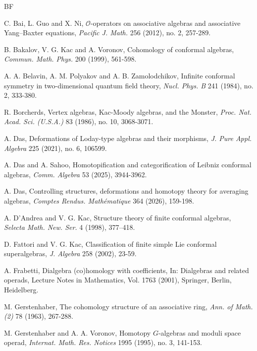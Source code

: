 \documentclass[a4paper,reqno,10pt]{amsart}
\theoremstyle{plain}
\theoremstyle{definition}
\theoremstyle{remark}
\begin{document}
\begin{thebibliography}{BF}

 C. Bai, L. Guo and X. Ni, $\mathcal{O}$-operators on associative algebras and associative Yang–Baxter equations, {\em Pacific J. Math. } 256 (2012), no. 2, 257-289.

B. Bakalov, V. G. Kac and A. Voronov, Cohomology of conformal algebras, {\em Commun. Math. Phys.} 200 (1999), 561-598.

 A. A. Belavin, A. M. Polyakov and A. B. Zamolodchikov, Infinite conformal symmetry in two-dimensional quantum field theory, {\em Nucl. Phys. B} 241 (1984), no. 2, 333-380.

 R. Borcherds, Vertex algebras, Kac-Moody algebras, and the Monster, {\em Proc. Nat. Acad. Sci. (U.S.A.)} 83 (1986), no. 10, 3068-3071.


 A. Das, Deformations of Loday-type algebras and their morphisms, {\em J. Pure Appl. Algebra} 225 (2021), no. 6, 106599.

 A. Das and A. Sahoo, Homotopification and categorification of Leibniz conformal algebras, {\em Comm. Algebra} 53 (2025), 3944-3962.

 A. Das, Controlling structures, deformations and homotopy theory for averaging algebras, {\em Comptes Rendus. Math\'{e}matique} 364 (2026), 159-198.

 A. D'Andrea and V. G. Kac, Structure theory of finite conformal algebras, {\em Selecta Math. New. Ser.} 4 (1998), 377–418.

 D. Fattori and V. G. Kac, Classification of finite simple Lie conformal superalgebras, {\em J. Algebra} 258 (2002), 23-59.

 A. Frabetti, Dialgebra (co)homology with coefficients, In: {Dialgebras and related operads}, Lecture Notes in Mathematics, Vol. 1763 (2001), Springer, Berlin, Heidelberg.

 M. Gerstenhaber, The cohomology structure of an associative ring, {\em Ann. of Math. (2)} 78 (1963), 267-288.


 M. Gerstenhaber and A. A. Voronov, Homotopy $G$-algebras and moduli space operad, {\em Internat. Math. Res. Notices} 1995 (1995), no. 3, 141-153.


\end{thebibliography}
\end{document}
